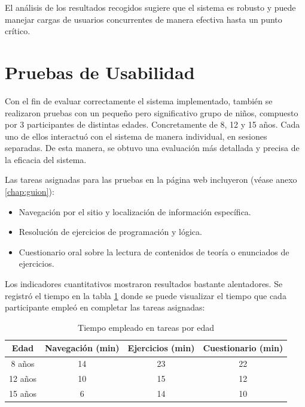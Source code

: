 El análisis de los resultados recogidos sugiere que el sistema es robusto y puede manejar cargas de usuarios concurrentes de manera efectiva hasta un punto crítico.

\section{Pruebas de Usabilidad}

Con el fin de evaluar correctamente el sistema implementado, también se realizaron pruebas con un pequeño pero significativo grupo de niños, compuesto por 3 participantes de distintas edades. Concretamente de 8, 12 y 15 años. Cada uno de ellos interactuó con el sistema de manera individual, en sesiones separadas. De esta manera, se obtuvo una evaluación más detallada y precisa de la eficacia del sistema.

Las tareas asignadas para las pruebas en la página web incluyeron (véase anexo \ref{chap:guion}):

\begin{itemize}
    \item Navegación por el sitio y localización de información específica.
    \item Resolución de ejercicios de programación y lógica.
    \item Cuestionario oral sobre la lectura de contenidos de teoría o enunciados de ejercicios.
\end{itemize}

Los indicadores cuantitativos mostraron resultados bastante alentadores. Se registró el tiempo en la tabla \ref{tab:pruebast} donde se puede visualizar el tiempo que cada participante empleó en completar las tareas asignadas:

\begin{table}[h]
\centering
\begin{tabular}{|c|c|c|c|}
\hline
Edad   & Navegación (min) & Ejercicios (min) & Cuestionario (min) \\ \hline
8 años & 14              & 23               & 22                 \\ \hline
12 años & 10              & 15               & 12                 \\ \hline
15 años & 6               & 14              & 10                 \\ \hline
\end{tabular}
\caption{Tiempo empleado en tareas por edad}
\label{tab:pruebast}
\end{table}

